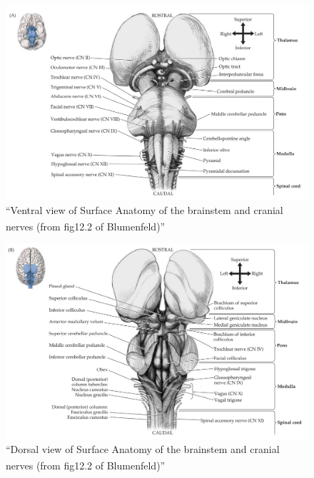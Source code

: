 \documentclass[
  letterpaper,
  DIV=11,
  numbers=noendperiod]{scrartcl}
\begin{document}
\begin{figure}[H]

{\centering \includegraphics{../../../../../../Alchemy Archive/Neuro/Neuroanatomy/Cranial Nerves/images/fig12.2A Surface anatomy of the brainstem and cranial nerves blumenfield2022.png}

}

\caption{``Ventral view of Surface Anatomy of the brainstem and cranial
nerves (from fig12.2 of
Blumenfeld\textsuperscript{})''}

\end{figure}%
\begin{figure}[H]

{\centering \includegraphics{../../../../../../Alchemy Archive/Neuro/Neuroanatomy/Cranial Nerves/images/fig12.2B Surface anatomy of the brainstem and cranial nerves blumenfield2022.png}

}

\caption{``Dorsal view of Surface Anatomy of the brainstem and cranial
nerves (from fig12.2 of
Blumenfeld\textsuperscript{})''}

\end{figure}%
\end{document}
